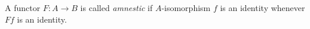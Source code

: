 \documentclass[12pt]{article}
\begin{document}
A functor $F: A\rightarrow B$ is called \emph{amnestic} if $A$-isomorphism $f$ is an identity whenever
$Ff$ is an identity.
\end{document}
